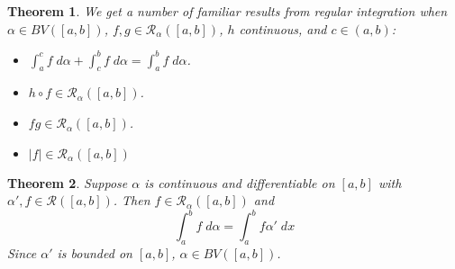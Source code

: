 \documentclass[12pt]{article}
\theoremstyle{plain}
\newtheorem{thm}{Theorem}[subsection]
\theoremstyle{definition}
\theoremstyle{remark}
\begin{document}
\begin{thm}
We get a number of familiar results from regular integration when $\alpha\in BV([a,b])$, $f,g\in\mathscr{R}_\alpha([a,b])$, $h$ continuous, and $c\in(a,b)$:
\begin{itemize}
    \item $\int^c_a f\;d\alpha + \int^b_c f\;d\alpha = \int^b_a f\;d\alpha$.
    \item $h\circ f\in\mathscr{R}_\alpha([a,b])$.
    \item $fg\in\mathscr{R}_\alpha([a,b])$.
    \item $|f|\in\mathscr{R}_\alpha([a,b])$
\end{itemize}
\end{thm}

\begin{thm}
\label{ftcbasis}
Suppose $\alpha$ is continuous and differentiable on $[a,b]$ with $\alpha', f\in\mathscr{R}([a,b])$. Then $f\in\mathscr{R}_\alpha([a,b])$ and
    \[ \int^b_a f\;d\alpha = \int^b_a f \alpha'\;dx\]
Since $\alpha'$ is bounded on $[a,b]$, $\alpha \in BV([a,b])$. 
\end{thm}
\end{document}
